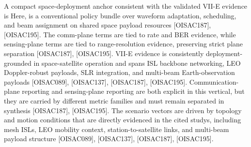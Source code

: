 {}
\markdownRendererSectionEnd \markdownRendererSectionBegin
{}\markdownRendererInterblockSeparator
{}A compact space-deployment anchor consistent with the validated VII-E evidence is\markdownRendererParagraphSeparator
{}\markdownRendererSoftLineBreak
{}\markdownRendererParagraphSeparator
{}Here,  is a conventional policy bundle over waveform adaptation, scheduling, and beam assignment on shared space payload resources [O\markdownRendererUnderscore{}ISAC\markdownRendererUnderscore{}187], [O\markdownRendererUnderscore{}ISAC\markdownRendererUnderscore{}195]. The comm-plane terms are tied to rate and BER evidence, while sensing-plane terms are tied to range-resolution evidence, preserving strict plane separation [O\markdownRendererUnderscore{}ISAC\markdownRendererUnderscore{}187], [O\markdownRendererUnderscore{}ISAC\markdownRendererUnderscore{}195].\markdownRendererParagraphSeparator
{}\markdownRendererInterblockSeparator
{}\markdownRendererUlBeginTight
\markdownRendererUlItem VII-E evidence is consistently deployment-grounded in space-satellite operation and spans ISL backbone networking, LEO Doppler-robust payloads, SLR integration, and multi-beam Earth-observation payloads [O\markdownRendererUnderscore{}ISAC\markdownRendererUnderscore{}089], [O\markdownRendererUnderscore{}ISAC\markdownRendererUnderscore{}137], [O\markdownRendererUnderscore{}ISAC\markdownRendererUnderscore{}187], [O\markdownRendererUnderscore{}ISAC\markdownRendererUnderscore{}195].\markdownRendererUlItemEnd 
\markdownRendererUlItem Communication-plane reporting and sensing-plane reporting are both explicit in this vertical, but they are carried by different metric families and must remain separated in synthesis [O\markdownRendererUnderscore{}ISAC\markdownRendererUnderscore{}187], [O\markdownRendererUnderscore{}ISAC\markdownRendererUnderscore{}195].\markdownRendererUlItemEnd 
\markdownRendererUlItem The scenario vectors are driven by topology and motion conditions that are directly evidenced in the cited studys, including mesh ISLs, LEO mobility context, station-to-satellite links, and multi-beam payload structure [O\markdownRendererUnderscore{}ISAC\markdownRendererUnderscore{}089], [O\markdownRendererUnderscore{}ISAC\markdownRendererUnderscore{}137], [O\markdownRendererUnderscore{}ISAC\markdownRendererUnderscore{}187], [O\markdownRendererUnderscore{}ISAC\markdownRendererUnderscore{}195].\markdownRendererUlItemEnd 
